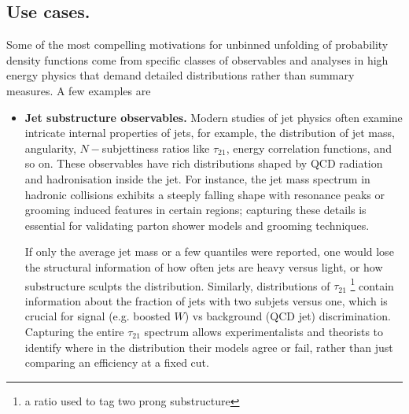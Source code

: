     \subsection{Use cases.}
    Some of the most compelling motivations for unbinned unfolding of probability density functions come from specific classes of observables and analyses in high energy physics that demand detailed distributions rather than summary measures.
    A few examples are
    \begin{itemize}
        \item \textbf{Jet substructure observables.}
            Modern studies of jet physics often examine intricate internal properties of jets, for example, the distribution of jet mass, angularity, $N-$subjettiness ratios like $\tau_{21}$, energy correlation functions, and so on.
            These observables have rich distributions shaped by QCD radiation and hadronisation inside the jet.
            For instance, the jet mass spectrum in hadronic collisions exhibits a steeply falling shape with resonance peaks or grooming induced features in certain regions;
            capturing these details is essential for validating parton shower models and grooming techniques.
            
            If only the average jet mass or a few quantiles were reported, one would lose the structural information of how often jets are heavy versus light, or how substructure sculpts the distribution.
            Similarly, distributions of $\tau_{21}$ \footnote{a ratio used to tag two prong substructure} contain information about the fraction of jets with two subjets versus one, which is crucial for signal (e.g. boosted $W$) vs background (QCD jet) discrimination.
            Capturing the entire $\tau_{21}$ spectrum allows experimentalists and theorists to identify where in the distribution their models agree or fail, rather than just comparing an efficiency at a fixed cut.
            

\end{itemize}
